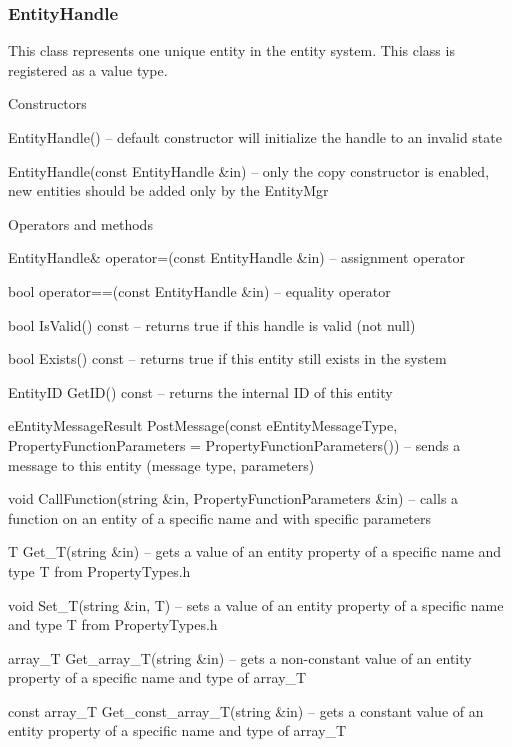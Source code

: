 \documentclass[12pt, a4paper]{article}
\newenvironment{titled-itemize}[1]
{
\vspace{5mm}
\noindent\textbf{#1}
\begin{itemize}
}
{
\end{itemize}
}
\begin{document}
\subsubsection{EntityHandle}

This class represents one unique entity in the entity system. This class is registered as a value type.

\begin{titled-itemize}{Constructors}
  \item EntityHandle() -- default constructor will initialize the handle to an invalid state
  \item EntityHandle(const EntityHandle \&in) -- only the copy constructor is enabled, new entities should be added only by the EntityMgr
\end{titled-itemize}

\begin{titled-itemize}{Operators and methods}
  \item EntityHandle\& operator=(const EntityHandle \&in) -- assignment operator
  \item bool operator==(const EntityHandle \&in) -- equality operator
  \item bool IsValid() const -- returns true if this handle is valid (not null)
  \item bool Exists() const -- returns true if this entity still exists in the system
  \item EntityID GetID() const -- returns the internal ID of this entity
  \item eEntityMessageResult PostMessage(const eEntityMessageType, PropertyFunctionParameters = PropertyFunctionParameters()) -- sends a message to this entity (message type, parameters)
  \item void CallFunction(string \&in, PropertyFunctionParameters \&in) -- calls a function on an entity of a specific name and with specific parameters
  \item T Get\_T(string \&in) -- gets a value of an entity property of a specific name and type T from PropertyTypes.h
  \item void Set\_T(string \&in, T) -- sets a value of an entity property of a specific name and type T from PropertyTypes.h
  \item array\_T Get\_array\_T(string \&in) -- gets a non-constant value of an entity property of a specific name and type of array\_T
  \item const array\_T Get\_const\_array\_T(string \&in) -- gets a constant value of an entity property of a specific name and type of array\_T
\end{titled-itemize}
\end{document}
